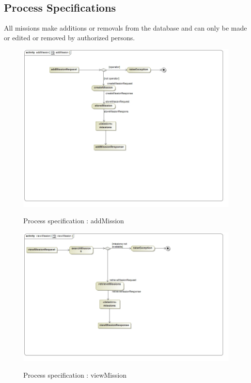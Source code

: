 \documentclass{article}
\begin{document}
	\subsection{Process Specifications}
	All missions make additions or removals from the database and can only be made or edited or removed by authorized persons.
		\begin{figure}[H]
				\includegraphics[width=\textwidth]{activity_addmission.jpg}  \\
				\caption{Process specification : addMission}
				\end{figure}
				
		\begin{figure}[H]
				\includegraphics[width=\textwidth]{activity_viewmission.jpg}  \\
				\caption{Process specification : viewMission}
				\end{figure}
				
\end{document}
